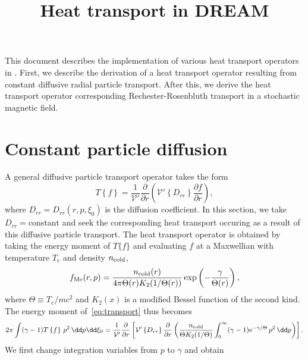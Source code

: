 \documentclass{notes}
\title{Heat transport in DREAM}
\author{}
\newcommand{\ee}{\mathrm{e}}
\newcommand{\fMe}{f_{\rm Me}}
\newcommand{\ncold}{n_{\rm cold}}
\newcommand{\Te}{T_e}
\newcommand{\Vp}{\mathcal{V}'}
\begin{document}
    \maketitle

    \noindent
    This document describes the implementation of various heat transport
    operators in \DREAM. First, we describe the derivation of a heat transport
    operator resulting from constant diffusive radial particle transport.
    After this, we derive the heat transport operator corresponding
    Rechester-Rosenbluth transport in a stochastic magnetic field.

    \tableofcontents

    \section{Constant particle diffusion}\label{sec:constant}
    A general diffusive particle transport operator takes the form
    \begin{equation}\label{eq:transport}
        T\left\{ f \right\} = \frac{1}{\Vp}\frac{\partial}{\partial r}\left(
            \Vp \left\{D_{rr}\right\}\frac{\partial f}{\partial r}
        \right),
    \end{equation}
    where $D_{rr} = D_{rr}(r,p,\xi_0)$ is the diffusion coefficient. In this
    section, we take $D_{rr} = \text{constant}$ and seek the corresponding heat
    transport occuring as a result of this diffusive particle transport. The
    heat transport operator is obtained by taking the energy moment of $T\{f\}$
    and evaluating $f$ at a Maxwellian with temperature $\Te$ and density
    $\ncold$,
    \begin{equation}
        \fMe(r,p) = \frac{\ncold(r)}{4\pi\Theta(r) K_2(1/\Theta(r))}\exp\left(-\frac{\gamma}{\Theta(r)}\right),
    \end{equation}
    where $\Theta\equiv\Te/mc^2$ and $K_2(x)$ is a modified Bessel function of
    the second kind. The energy moment of~\eqref{eq:transport} thus becomes
    \begin{equation}
        2\pi\int(\gamma-1) T\left\{f\right\}\,p^2\,\dd p\dd\xi_0 =
            \frac{1}{\Vp}\frac{\partial}{\partial r}\left[
                \Vp\left\{D_{rr}\right\}\frac{\partial}{\partial r} \left(
                    \frac{\ncold}{\Theta K_2(1/\Theta)} \int_0^\infty (\gamma-1) \ee^{-\gamma/\Theta}\,p^2\,\dd p
                \right)
            \right].
    \end{equation}
    We first change integration variables from $p$ to $\gamma$ and obtain
\end{document}
